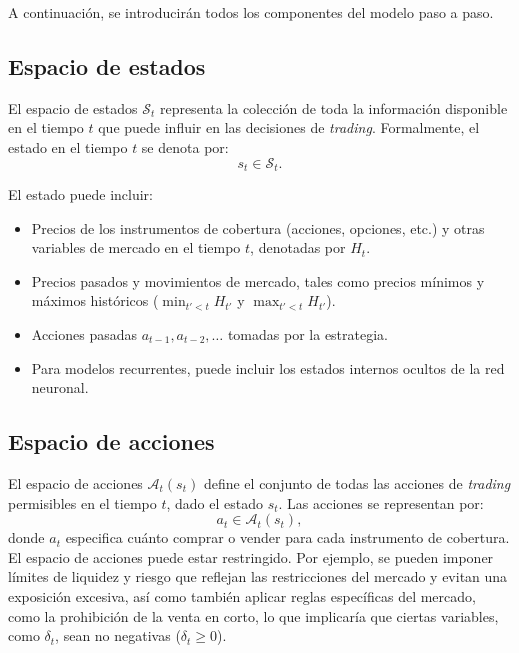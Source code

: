 \documentclass[11pt,a4paper,spanish]{article}
\numberwithin{equation}{section} %
\begin{document}
A continuación, se introducirán todos los componentes del modelo paso a paso.

\subsection{Espacio de estados}

El espacio de estados \( \mathcal{S}_t \) representa la colección de toda la información disponible en el tiempo \( t \) que puede influir en las decisiones de \textit{trading}. Formalmente, el estado en el tiempo \( t \) se denota por:
\begin{equation}
s_t \in \mathcal{S}_t.
\end{equation}

El estado puede incluir:
\begin{itemize}
    \item Precios de los instrumentos de cobertura (acciones, opciones, etc.) y otras variables de mercado en el tiempo \( t \), denotadas por \( H_t \).
    \item Precios pasados y movimientos de mercado, tales como precios mínimos y máximos históricos (\( \min_{t' < t} H_{t'} \) y \( \max_{t' < t} H_{t'} \)).
    \item Acciones pasadas \( a_{t-1}, a_{t-2}, \dots \) tomadas por la estrategia.
    \item Para modelos recurrentes, puede incluir los estados internos ocultos de la red neuronal.
\end{itemize}

\subsection{Espacio de acciones}

El espacio de acciones \( \mathcal{A}_t(s_t) \) define el conjunto de todas las acciones de \textit{trading} permisibles en el tiempo \( t \), dado el estado \( s_t \). Las acciones se representan por:
\begin{equation}
a_t \in \mathcal{A}_t(s_t),
\end{equation}
donde \( a_t \) especifica cuánto comprar o vender para cada instrumento de cobertura.
El espacio de acciones puede estar restringido. Por ejemplo, se pueden imponer límites de liquidez y riesgo que reflejan las restricciones del mercado y evitan una exposición excesiva, así como también aplicar reglas específicas del mercado, como la prohibición de la venta en corto, lo que implicaría que ciertas variables, como \( \delta_t \), sean no negativas (\( \delta_t \geq 0 \)).
\end{document}
